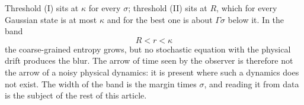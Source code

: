 Threshold (I) sits at $\kappa$ for every $\sigma$; threshold (II) sits at $R$, which for every Gaussian state is at most $\kappa$ and for the best one is about $\Gamma\sigma$ below it. In the band
\begin{equation}
R < r < \kappa
\label{eq:band}
\end{equation}
the coarse-grained entropy grows, but no stochastic equation with the physical drift produces the blur. The arrow of time seen by the observer is therefore not the arrow of a noisy physical dynamics: it is present where such a dynamics does not exist. The width of the band is the margin times $\sigma$, and reading it from data is the subject of the rest of this article.
